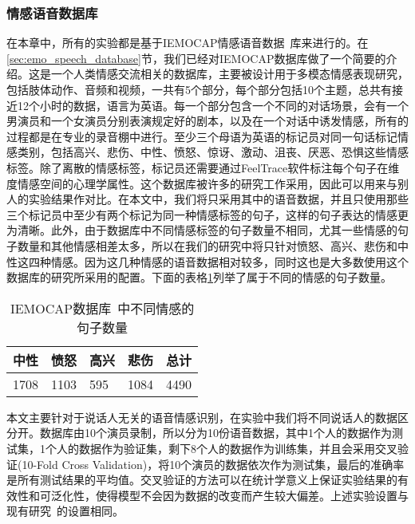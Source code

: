 \subsubsection{情感语音数据库}
\label{sssec:speech_database}

在本章中，所有的实验都是基于IEMOCAP情感语音数据~\cite{Busso2008IEMOCAP}库来进行的。在\ref{sec:emo_speech_database}节，我们已经对IEMOCAP数据库做了一个简要的介绍。这是一个人类情感交流相关的数据库，主要被设计用于多模态情感表现研究，包括肢体动作、音频和视频，一共有5个部分，每个部分包括10个主题，总共有接近12个小时的数据，语言为英语。每一个部分包含一个不同的对话场景，会有一个男演员和一个女演员分别表演规定好的剧本，以及在一个对话中诱发情感，所有的过程都是在专业的录音棚中进行。至少三个母语为英语的标记员对同一句话标记情感类别，包括高兴、悲伤、中性、愤怒、惊讶、激动、沮丧、厌恶、恐惧这些情感标签。除了离散的情感标签，标记员还需要通过FeelTrace软件标注每个句子在维度情感空间的心理学属性。这个数据库被许多的研究工作采用，因此可以用来与别人的实验结果作对比。在本文中，我们将只采用其中的语音数据，并且只使用那些三个标记员中至少有两个标记为同一种情感标签的句子，这样的句子表达的情感更为清晰。此外，由于数据库中不同情感标签的句子数量不相同，尤其一些情感的句子数量和其他情感相差太多，所以在我们的研究中将只针对愤怒、高兴、悲伤和中性这四种情感。因为这几种情感的语音数据相对较多，同时这也是大多数使用这个数据库的研究所采用的配置。下面的表格\ref{tab:emo_sample_num}列举了属于不同的情感的句子数量。

\begin{table}[htb]
\centering
\begin{minipage}[htb]{0.8\linewidth} %
\caption{IEMOCAP数据库~\cite{Busso2008IEMOCAP}中不同情感的句子数量}
\label{tab:emo_sample_num}
    \begin{tabularx}{\linewidth}{X<{\centering} X<{\centering} X<{\centering} X<{\centering} X<{\centering}}
        \toprule[1.5pt]
        中性 & 愤怒 & 高兴 & 悲伤 & 总计 \\
        \midrule[1pt]
        1708 & 1103 & 595 & 1084 & 4490 \\
        \bottomrule[1.5pt]
    \end{tabularx}
\end{minipage}
\end{table}

本文主要针对于说话人无关的语音情感识别，在实验中我们将不同说话人的数据区分开。数据库由10个演员录制，所以分为10份语音数据，其中1个人的数据作为测试集，1个人的数据作为验证集，剩下8个人的数据作为训练集，并且会采用交叉验证(10-Fold Cross Validation)，将10个演员的数据依次作为测试集，最后的准确率是所有测试结果的平均值。交叉验证的方法可以在统计学意义上保证实验结果的有效性和可泛化性，使得模型不会因为数据的改变而产生较大偏差。上述实验设置与现有研究~\cite{Lee2009Emotion}的设置相同。

